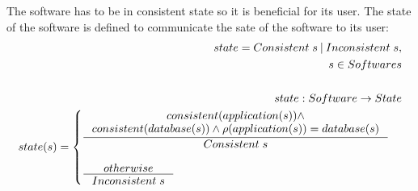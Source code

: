 \documentclass[11pt]{article}
\begin{document}
The software has to be in consistent state so it is beneficial for its user. The state of the software is defined to communicate the sate of the software to its user:
\begin{align*}
	state = Consistent\; s \: | \: Inconsistent \; s, \\
	s \in Softwares  \\ \\
	state : Software \rightarrow State \\
	state(s) = \begin{cases}
 		\inference{consistent(application(s)) \wedge \\ consistent(database(s)) \wedge \rho(application(s)) = database(s)}{Consistent \; s}\\ \\
 		\inference{otherwise}{Inconsistent \; s}
 	\end{cases}
\end{align*}
\end{document}
